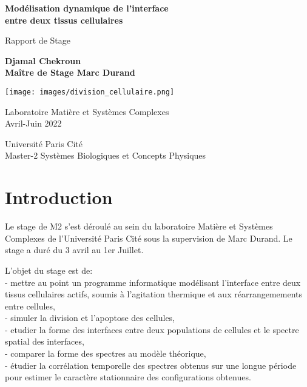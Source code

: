 \documentclass[11pt,a4paper]{article}
\begin{document}
\begin{titlepage}
    \begin{center}
        \vspace*{3cm}
            
        \LARGE
        \textbf{Modélisation dynamique de l’interface \\entre deux tissus cellulaires}
            
        \vspace{0.5cm}
        \LARGE
        Rapport de Stage
            
        \vspace{1.5cm}
        \Large   
        \textbf{Djamal Chekroun\\Maître de Stage Marc Durand}
        
        \vfill
        
        \texttt{[image: images/division\_cellulaire.png]}
            
        \vfill
            
        Laboratoire Matière et Systèmes Complexes\\
        Avril-Juin 2022
            
        \vspace{0.8cm}
            
            
        \Large
        Université Paris Cité\\
        Master-2 Systèmes Biologiques et Concepts Physiques\\
        
            
    \end{center}
\end{titlepage}


\tableofcontents

\newpage

\section{Introduction}

Le stage de M2 s’est déroulé au sein du laboratoire Matière et Systèmes Complexes de l'Université Paris Cité sous la supervision de Marc Durand. Le stage a duré du 3 avril au 1er Juillet.

L’objet du stage est de: \\
- mettre au point un programme informatique modélisant l’interface entre deux tissus cellulaires actifs, soumis à l’agitation thermique et aux réarrangemements entre cellules,\\
- simuler la division et l'apoptose des cellules,\\
- etudier la forme des interfaces entre deux populations de cellules et le spectre spatial des interfaces, \\
- comparer la forme des spectres au modèle théorique, \\
- étudier la corrélation temporelle des spectres obtenus sur une longue période pour estimer le caractère stationnaire des configurations obtenues.\\
\end{document}
